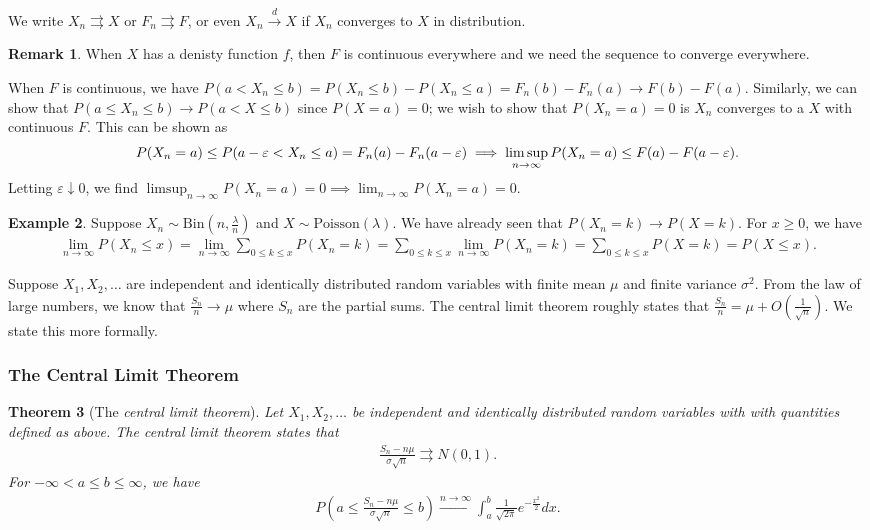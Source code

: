 \documentclass[15pt,a4paper]{book}
\newtheorem{theorem}{Theorem}[chapter]
\theoremstyle{definition}
\newtheorem{example}[theorem]{Example}
\newtheorem{remark}[theorem]{Remark}
\newcommand{\eax}[1]{\emph{#1}\index{#1}} %
\newcommand{\toup}[1]{\xrightarrow{#1}}
\begin{document}
We write $X_{n} \rightrightarrows X$ or $F_{n} \rightrightarrows F$, or even $X_{n} \toup{d} X$ if $X_{n}$ converges to $X$ in distribution.

\begin{remark}
    When $X$ has a denisty function $f$, then $F$ is continuous everywhere and we need the sequence to converge everywhere.
\end{remark}

When $F$ is continuous, we have $P(a < X_{n} \leq b) = P(X_{n} \leq b) - P(X_{n} \leq a) = F_{n}(b)-F_{n}(a) \to F(b)-F(a)$. Similarly, we can show that $P(a \leq X_{n} \leq b) \to P(a < X \leq b)$ since $P(X = a) = 0$; we wish to show that $P(X_{n} = a) = 0$ is $X_{n}$ converges to a $X$ with continuous $F$. This can be shown as
\begin{align}
    P(X_{n}=a) \leq P(a-\varepsilon < X_{n} \leq a) = F_{n}(a)-F_{n}(a-\varepsilon) \notag \implies \limsup_{n \to \infty} P(X_{n}=a) \leq F(a) - F(a-\varepsilon).
\end{align}
Letting $\varepsilon \downarrow 0$, we find $\limsup_{n \to \infty} P(X_{n}=a) = 0 \implies \lim_{n \to \infty} P(X_{n}=a) = 0$.

\begin{example}
    Suppose $X_{n} \sim \text{Bin}(n,\frac{\lambda}{n})$ and $X \sim \text{Poisson}(\lambda)$. We have already seen that $P(X_{n}=k) \to P(X=k)$. For $x \geq 0$, we have
    \begin{align}
        \lim_{n \to \infty} P(X_{n} \leq x) = \lim_{n \to \infty} \sum_{0 \leq k \leq x}P(X_{n} = k) = \sum_{0 \leq k \leq x} \lim_{n \to \infty} P(X_{n} = k) = \sum_{0 \leq k \leq x} P(X=k) = P(X \leq x).
    \end{align}
\end{example}

Suppose $X_{1},X_{2},\ldots$ are independent and identically distributed random variables with finite mean $\mu$ and finite variance $\sigma^{2}$. From the law of large numbers, we know that $\frac{S_{n}}{n} \to \mu$ where $S_{n}$ are the partial sums. The central limit theorem roughly states that $\frac{S_{n}}{n} = \mu + O(\frac{1}{\sqrt{n}})$. We state this more formally.

\subsubsection{The Central Limit Theorem}

\begin{theorem}[The \eax{central limit theorem}]
    Let $X_{1},X_{2},\ldots$ be independent and identically distributed random variables with with quantities defined as above. The central limit theorem states that
    \begin{align*}
        \frac{S_{n}-n\mu}{\sigma\sqrt{n}} \rightrightarrows N(0,1).
    \end{align*}
    For $-\infty < a \leq b \leq \infty$, we have
    \begin{align*}
        P\left(a \leq \frac{S_{n}-n\mu}{\sigma \sqrt{n}} \leq b  \right) \toup{n \to \infty} \int_{a}^{b} \frac{1}{\sqrt{2\pi}} e^{-\frac{x^{2}}{2}} dx.
    \end{align*}
\end{theorem}
\end{document}
